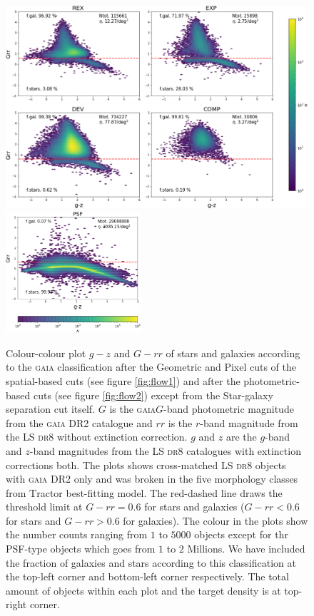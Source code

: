 \documentclass[fleqn,usenatbib]{mnras}
\newcommand{\DReight}{\textsc{dr8}\xspace}
\newcommand{\GAIA}{\textsc{gaia}\xspace}
\newcommand{\TRACTOR}{\textsc{T}ractor\xspace}
\begin{document}
\begin{figure}
	\includegraphics[width=12cm]{images/gz_Grr_bgsbutsg_hexbin_extended}
	\includegraphics[width=5cm]{images/gz_Grr_bgsbutsg_hexbin_psf}
    \caption{Colour-colour plot $g-z$ and $G-rr$ of stars and galaxies according to the \GAIA classification after the Geometric and Pixel cuts of the spatial-based cuts (see  figure \ref{fig:flow1}) and after the photometric-based cuts (see figure \ref{fig:flow2}) except from the Star-galaxy separation cut itself. $G$ is the \GAIA $G$-band photometric magnitude from the \GAIA DR2 catalogue and $rr$ is the $r$-band magnitude from the LS \DReight without extinction correction. $g$ and $z$ are the $g$-band and $z$-band magnitudes from the LS \DReight catalogues with extinction corrections both. The plots shows cross-matched LS \DReight objects with \GAIA DR2 only and was broken in the five morphology classes from \TRACTOR best-fitting model. The red-dashed line draws the threshold limit at $G-rr = 0.6$ for stars and galaxies ($G-rr < 0.6$ for stars and $G-rr > 0.6$ for galaxies). The colour in the plots show the number counts ranging from $1$ to $5000$ objects except for thr PSF-type objects which goes from $1$ to $2$ Millions. We have included the fraction of galaxies and stars according to this classification at the top-left corner and bottom-left corner respectively. The total amount of objects within each plot and the target density is at top-right corner.}


\end{figure}
\end{document}
